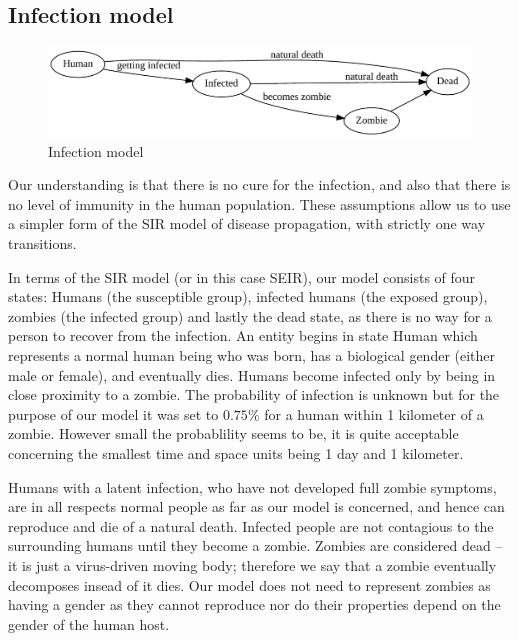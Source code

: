 \documentclass[a4paper]{article}
\begin{document}
\subsection{Infection model}

\begin{figure}[ht]
        \centering
        \includegraphics[width=\textwidth]{model}
        \caption{Infection model}
\end{figure}

Our understanding is that there is no cure for the infection, and also that there is no level of immunity in the human population.
These assumptions allow us to use a simpler form of the SIR model of disease propagation, with strictly one way transitions.

In terms of the SIR model (or in this case SEIR), our model consists of four states: Humans (the susceptible group), infected humans (the exposed group), zombies (the infected group) and lastly the dead state, as there is no way for a person to recover from the infection.
An entity begins in state Human which represents a normal human being who was born, has a biological gender (either male or female), and eventually dies.
Humans become infected only by being in close proximity to a zombie.
The probability of infection is unknown but for the purpose of our model it was set to $0.75\%$ for a human within 1 kilometer of a zombie.
However small the probablility seems to be, it is quite acceptable concerning the smallest time and space units being 1 day and 1 kilometer.

Humans with a latent infection, who have not developed full zombie symptoms, are in all respects normal people as far as our model is concerned, and hence can reproduce and die of a natural death.
Infected people are not contagious to the surrounding humans until they become a zombie.
Zombies are considered dead -- it is just a virus-driven moving body; therefore we say that a zombie eventually decomposes insead of it dies.
Our model does not need to represent zombies as having a gender as they cannot reproduce nor do their properties depend on the gender of the human host.
\end{document}
